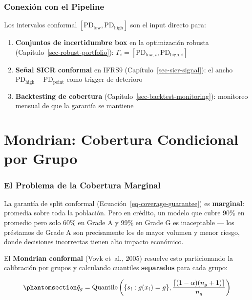 \documentclass[
  spanish,
  11pt,
  letterpaper,
]{scrbook}
\providecommand{\tightlist}{%
  \setlength{\itemsep}{0pt}\setlength{\parskip}{0pt}}
\theoremstyle{plain}
\theoremstyle{remark}
\begin{document}
\subsection{Conexión con el Pipeline}\label{conexiuxf3n-con-el-pipeline}

Los intervalos conformal
\([\text{PD}_\text{low}, \text{PD}_\text{high}]\) son el input directo
para:

\begin{enumerate}
\def\labelenumi{\arabic{enumi}.}
\tightlist
\item
  \textbf{Conjuntos de incertidumbre box} en la optimización robusta
  (Capítulo~\ref{sec-robust-portfolio}):
  \(\Gamma_i = [\text{PD}_{\text{low},i}, \text{PD}_{\text{high},i}]\)
\item
  \textbf{Señal SICR conformal} en IFRS9
  (Capítulo~\ref{sec-sicr-signal}): el ancho
  \(\text{PD}_\text{high} - \text{PD}_\text{point}\) como trigger de
  deterioro
\item
  \textbf{Backtesting de cobertura}
  (Capítulo~\ref{sec-backtest-monitoring}): monitoreo mensual de que la
  garantía se mantiene
\end{enumerate}

\chapter{Mondrian: Cobertura Condicional por Grupo}\label{sec-mondrian}

\subsection{El Problema de la Cobertura
Marginal}\label{el-problema-de-la-cobertura-marginal}

La garantía de split conformal (Ecuación~\ref{eq-coverage-guarantee}) es
\textbf{marginal}: promedia sobre toda la población. Pero en crédito, un
modelo que cubre 90\% en promedio pero solo 60\% en Grade A y 99\% en
Grade G es inaceptable --- los préstamos de Grade A son precisamente los
de mayor volumen y menor riesgo, donde decisiones incorrectas tienen
alto impacto económico.

El \textbf{Mondrian conformal} (Vovk et~al., 2005) resuelve esto
particionando la calibración por grupos y calculando cuantiles
\textbf{separados} para cada grupo:

\begin{equation}\protect\phantomsection\label{eq-mondrian-quantile}{
\hat{q}_g = \text{Quantile}\left(\{s_i : g(x_i) = g\}, \frac{\lceil(1-\alpha)(n_g+1)\rceil}{n_g}\right)
}\end{equation}
\end{document}
